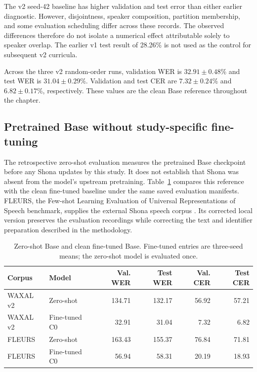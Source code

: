\documentclass[12pt,a4paper]{report}
\begin{document}
The v2 seed-42 baseline has higher validation and test error than either earlier diagnostic. However, disjointness, speaker composition, partition membership, and some evaluation scheduling differ across these records. The observed differences therefore do not isolate a numerical effect attributable solely to speaker overlap. The earlier v1 test result of 28.26\% is not used as the control for subsequent v2 curricula.

Across the three v2 random-order runs, validation WER is $32.91\pm0.48$\% and test WER is $31.04\pm0.29$\%. Validation and test CER are $7.32\pm0.24$\% and $6.82\pm0.17$\%, respectively. These values are the clean Base reference throughout the chapter.

\subsection{Pretrained Base without study-specific fine-tuning}

The retrospective zero-shot evaluation measures the pretrained Base checkpoint before any Shona updates by this study. It does not establish that Shona was absent from the model's upstream pretraining. Table~\ref{tab:results-zero} compares this reference with the clean fine-tuned baseline under the same saved evaluation manifests. FLEURS, the Few-shot Learning Evaluation of Universal Representations of Speech benchmark, supplies the external Shona speech corpus \citep{Conneau2022}. Its corrected local version preserves the evaluation recordings while correcting the text and identifier preparation described in the methodology.

\begin{table}[htbp]\centering\small
\caption{Zero-shot Base and clean fine-tuned Base. Fine-tuned entries are three-seed means; the zero-shot model is evaluated once.}\label{tab:results-zero}
\begin{tabular}{llrrrr}\toprule
Corpus & Model & Val. WER & Test WER & Val. CER & Test CER\\\midrule
WAXAL v2 & Zero-shot & 134.71 & 132.17 & 56.92 & 57.21\\
WAXAL v2 & Fine-tuned C0 & 32.91 & 31.04 & 7.32 & 6.82\\
FLEURS & Zero-shot & 163.43 & 155.37 & 76.84 & 71.81\\
FLEURS & Fine-tuned C0 & 56.94 & 58.31 & 20.19 & 18.93\\\bottomrule
\end{tabular}\end{table}
\end{document}
